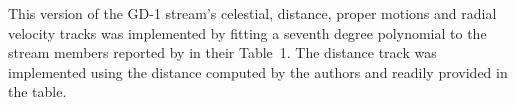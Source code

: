 This version of the GD-1 stream's celestial, distance, proper motions and radial velocity tracks was implemented by fitting a seventh degree polynomial to the stream members reported by \citet{Ibata2021} in their Table~1. The distance track was implemented using the distance computed by the authors and readily provided in the table.
